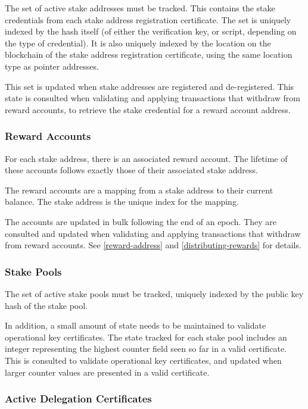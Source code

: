 \documentclass[11pt,a4paper,dvipsnames,twosided]{article}
\begin{document}
The set of active stake addresses must be tracked. This contains the stake
credentials from each stake address registration certificate. The set is
uniquely indexed by the hash itself (of either the verification key, or script,
depending on the type of credential). It is also uniquely indexed by the
location on the blockchain of the stake address registration certificate, using
the same location type as pointer addresses.

This set is updated when stake addresses are registered and de-registered. This
state is consulted when validating and applying transactions that withdraw from
reward accounts, to retrieve the stake credential for a reward account address.

\subsubsection{Reward Accounts}
\label{reward-accounts}

For each stake address, there is an associated reward account. The lifetime of
these accounts follows exactly those of their associated stake address.

The reward accounts are a mapping from a stake address to their current balance.
The stake address is the unique index for the mapping.

The accounts are updated in bulk following the end of an epoch. They are
consulted and updated when validating and applying transactions that withdraw
from reward accounts. See \cref{reward-address} and \cref{distributing-rewards}
for details.

\subsubsection{Stake Pools}
\label{stake-pools}

The set of active stake pools must be tracked, uniquely indexed
by the public key hash of the stake pool.

In addition, a small amount of state needs to be maintained to validate
operational key certificates. The state tracked for each stake pool includes
an integer representing the highest counter field seen so far in a valid
certificate. This is consulted to validate operational key certificates, and
updated when larger counter values are presented in a valid certificate.

\subsubsection{Active Delegation Certificates}
\label{active-delegation-certificates}
\end{document}
